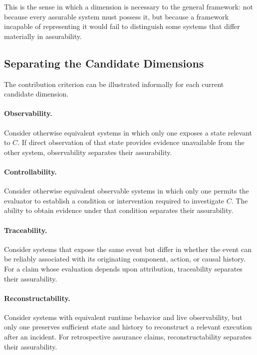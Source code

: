 This is the sense in which a dimension is necessary to the general
framework: not because every assurable system must possess it,
but because a framework incapable of representing it would fail
to distinguish some systems that differ materially in assurability.

\subsection{Separating the Candidate Dimensions}
\label{aa.subsec.separating-dimensions}

The contribution criterion can be illustrated informally for each
current candidate dimension.

\paragraph{Observability.}
Consider otherwise equivalent systems in which only one exposes
a state relevant to \(C\).
If direct observation of that state provides evidence unavailable
from the other system, observability separates their assurability.


\paragraph{Controllability.}
Consider otherwise equivalent observable systems in which only one
permits the evaluator to establish a condition or intervention
required to investigate \(C\).
The ability to obtain evidence under that condition separates
their assurability.

\paragraph{Traceability.}
Consider systems that expose the same event but differ in whether
the event can be reliably associated with its originating component,
action, or causal history.
For a claim whose evaluation depends upon attribution, traceability
separates their assurability.

\paragraph{Reconstructability.}
Consider systems with equivalent runtime behavior and live
observability, but only one preserves sufficient state and history
to reconstruct a relevant execution after an incident.
For retrospective assurance claims, reconstructability separates
their assurability.

